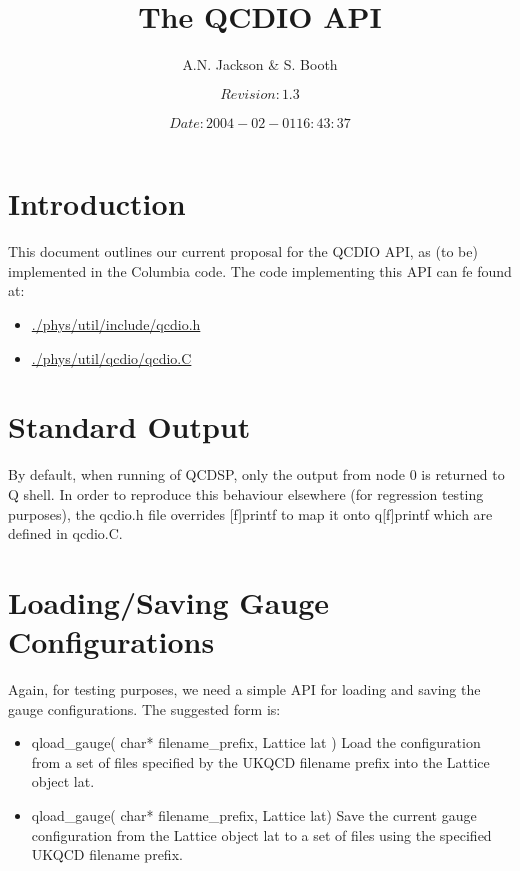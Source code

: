 \documentclass[12pt]{article}
\title{The QCDIO API}
\author{A.N. Jackson \& S. Booth}
\date{\mbox{\small $$Revision: 1.3 $$  $$Date: 2004-02-01 16:43:37 $$}}
\begin{document}
\maketitle

\tableofcontents
\newpage

\section{Introduction}
This document outlines our current proposal for the QCDIO API, as (to be)
implemented in the Columbia code.  The code implementing this API can fe found
at: 
\begin{itemize}
 \item
 \href{../doxygen/html/qcdio_h.html}{./phys/util/include/qcdio.h}
 \item
 \href{../doxygen/html/qcdio_C.html}{./phys/util/qcdio/qcdio.C}
\end{itemize}

\section{Standard Output}
By default, when running of QCDSP, only the output from node 0 is returned to
Q shell.  In order to reproduce this behaviour elsewhere (for regression testing
purposes), the qcdio.h file overrides [f]printf to map it onto q[f]printf
which are defined in qcdio.C.

\section{Loading/Saving Gauge Configurations}
Again, for testing purposes, we need a simple API for loading and saving the
gauge configurations.  The suggested form is:
\begin{itemize}
\item{qload\_gauge( char* filename\_prefix, Lattice lat )}
Load the configuration from a set of files specified by the UKQCD filename
prefix into the Lattice object lat.
\item{qload\_gauge( char* filename\_prefix, Lattice lat)}
Save the current gauge configuration from the Lattice object lat to a set of 
files using the specified UKQCD filename prefix.
\end{itemize}
\end{document}
